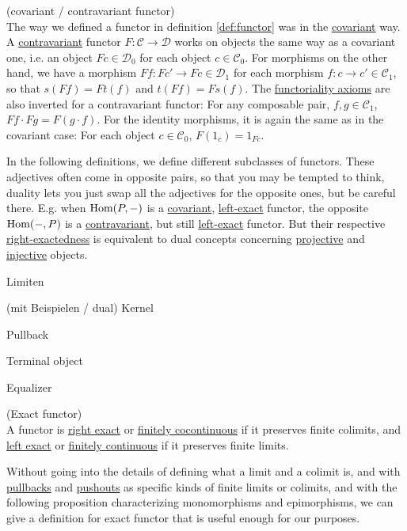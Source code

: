 \begin{definition}{(covariant / contravariant functor)}\\
The way we defined a functor in definition \ref{def:functor} was in the \ul{covariant} way.\\
A \ul{contravariant} functor $F : \mathcal{C} \rightarrow \mathcal{D}$ works on objects the same way as a covariant one, i.e.
an object $Fc \in \mathcal{D}_{0}$ for each object $c \in \mathcal{C}_{0}$. For morphisms on the other hand, we have
a morphism $F f : Fc' \rightarrow Fc \in \mathcal{D}_{1}$ for each morphism $f : c \rightarrow c' \in \mathcal{C}_{1}$, so that
$s(F f) = F t(f)$ and $t(F f) = F s(f)$.
The \ul{functoriality axioms} are also inverted for a contravariant functor:
For any composable pair, $f, g \in \mathcal{C}_{1}$, $F f \cdot F g = F(g \cdot f)$.
For the identity morphisms, it is again the same as in the covariant case:
For each object $c \in \mathcal{C}_{0}$, $F(1_{c}) = 1_{Fc}$.
\end{definition}

In the following definitions, we define different subclasses of functors. These adjectives often come in opposite pairs, so that you may be
tempted to think, duality lets you just swap all the adjectives for the opposite ones, but be careful there. E.g. when 
$\textup{Hom}(P,-)$ is a \ul{covariant}, \ul{left-exact} functor, the opposite $\textup{Hom}(-,P)$ is a \ul{contravariant}, but still \ul{left-exact} functor.
But their respective \ul{right-exactedness} is equivalent to dual concepts concerning \ul{projective} and \ul{injective} objects.

Limiten 

(mit Beispielen / dual)
Kernel

Pullback

Terminal object

Equalizer

\begin{definition}{(Exact functor)}\label{def:exact_functor}\\
A functor is \ul{right exact} or \ul{finitely cocontinuous} if it preserves finite colimits, and \ul{left exact} or \ul{finitely continuous} if it preserves finite limits.
\end{definition}

\begin{remark}
Without going into the details of defining what a limit and a colimit is, and with \ul{pullbacks} and \ul{pushouts} as specific kinds of
finite limits or colimits, and with the following proposition characterizing monomorphisms and epimorphisms,
we can give a definition for exact functor that is useful enough for our purposes.
\end{remark}

